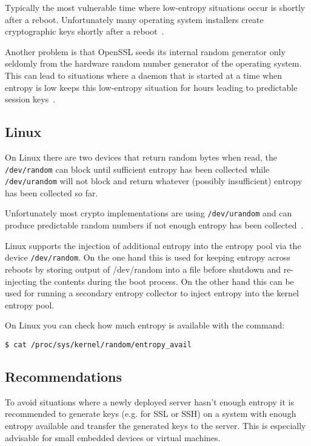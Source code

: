 Typically the most vulnerable time where low-entropy situations occur is
shortly after a reboot. Unfortunately many operating system installers
create cryptographic keys shortly after a reboot~\cite{HDWH12}.

Another problem is that OpenSSL seeds its internal random generator only
seldomly from the hardware random number generator of the operating
system. This can lead to situations where a daemon that is started at a
time when entropy is low keeps this low-entropy situation for hours
leading to predictable session keys~\cite{HDWH12}.

\subsection{Linux}
\label{subsec:RNG-linux}

On Linux there are two devices that return random bytes when read, the
\verb+/dev/random+ can block until sufficient entropy has been collected
while \verb+/dev/urandom+ will not block and return whatever (possibly
insufficient) entropy has been collected so far.

Unfortunately most crypto implementations are using \verb+/dev/urandom+
and can produce predictable random numbers if not enough entropy has
been collected~\cite{HDWH12}.

Linux supports the injection of additional entropy into the entropy pool
via the device \verb+/dev/random+. On the one hand this is used for
keeping entropy across reboots by storing output of /dev/random into a
file before shutdown and re-injecting the contents during the boot
process. On the other hand this can be used for running a secondary
entropy collector to inject entropy into the kernel entropy pool.

On Linux you can check how much entropy is available with the command:
\begin{lstlisting}
$ cat /proc/sys/kernel/random/entropy_avail
\end{lstlisting}



\subsection{Recommendations}

To avoid situations where a newly deployed server hasn't enough
entropy it is recommended to generate keys (e.g. for SSL or SSH) on
a system with enough entropy available and transfer the generated keys
to the server.  This is especially advisable for small embedded devices
or virtual machines.

